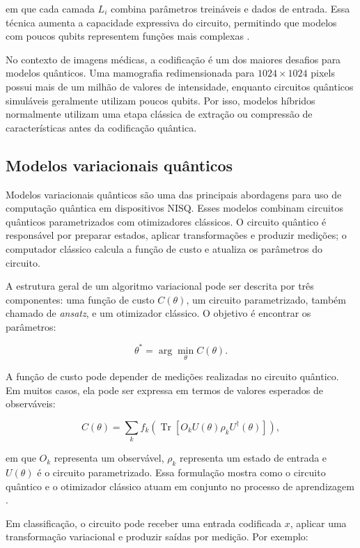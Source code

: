 \documentclass[
    12pt,
    openright,
    oneside,
    a4paper,
    english,
    brazil
]{abntex2}
\begin{document}
em que cada camada \(L_i\) combina parâmetros treináveis e dados de entrada. Essa técnica aumenta a capacidade expressiva do circuito, permitindo que modelos com poucos qubits representem funções mais complexas \cite{perezsalinas2020data}.

No contexto de imagens médicas, a codificação é um dos maiores desafios para modelos quânticos. Uma mamografia redimensionada para \(1024 \times 1024\) pixels possui mais de um milhão de valores de intensidade, enquanto circuitos quânticos simuláveis geralmente utilizam poucos qubits. Por isso, modelos híbridos normalmente utilizam uma etapa clássica de extração ou compressão de características antes da codificação quântica.

\subsection{Modelos variacionais quânticos}

Modelos variacionais quânticos são uma das principais abordagens para uso de computação quântica em dispositivos NISQ. Esses modelos combinam circuitos quânticos parametrizados com otimizadores clássicos. O circuito quântico é responsável por preparar estados, aplicar transformações e produzir medições; o computador clássico calcula a função de custo e atualiza os parâmetros do circuito.

A estrutura geral de um algoritmo variacional pode ser descrita por três componentes: uma função de custo \(C(\theta)\), um circuito parametrizado, também chamado de \textit{ansatz}, e um otimizador clássico. O objetivo é encontrar os parâmetros:

\[
\theta^* =
\arg\min_{\theta}
C(\theta).
\]

A função de custo pode depender de medições realizadas no circuito quântico. Em muitos casos, ela pode ser expressa em termos de valores esperados de observáveis:

\[
C(\theta)
=
\sum_k
f_k
\left(
\operatorname{Tr}
[
O_k U(\theta)\rho_k U^\dagger(\theta)
]
\right),
\]

em que \(O_k\) representa um observável, \(\rho_k\) representa um estado de entrada e \(U(\theta)\) é o circuito parametrizado. Essa formulação mostra como o circuito quântico e o otimizador clássico atuam em conjunto no processo de aprendizagem \cite{cerezo2021variational}.

Em classificação, o circuito pode receber uma entrada codificada \(x\), aplicar uma transformação variacional e produzir saídas por medição. Por exemplo:
\end{document}
